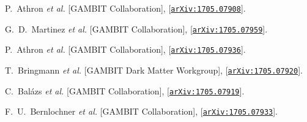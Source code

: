 \documentclass{PoS}
\begin{document}
\begin{thebibliography}{99}

  P.~Athron {\it et al.} [GAMBIT Collaboration],
   [\href{http://arxiv.org/abs/1705.07908}{{\tt arXiv:1705.07908}}].

  G.~D.~Martinez {\it et al.} [GAMBIT Collaboration],
     [\href{http://arxiv.org/abs/1705.07959}{{\tt arXiv:1705.07959}}].


  P.~Athron {\it et al.} [GAMBIT Collaboration],
       [\href{http://arxiv.org/abs/1705.07936}{{\tt arXiv:1705.07936}}].

  T.~Bringmann {\it et al.} [GAMBIT Dark Matter Workgroup],
       [\href{http://arxiv.org/abs/1705.07920}{{\tt arXiv:1705.07920}}].

  
  C.~Bal\'azs {\it et al.} [GAMBIT Collaboration],
       [\href{http://arxiv.org/abs/1705.07919}{{\tt arXiv:1705.07919}}].

  F.~U.~Bernlochner {\it et al.} [GAMBIT Collaboration],
       [\href{http://arxiv.org/abs/1705.07933}{{\tt arXiv:1705.07933}}].




\end{thebibliography}
\end{document}
